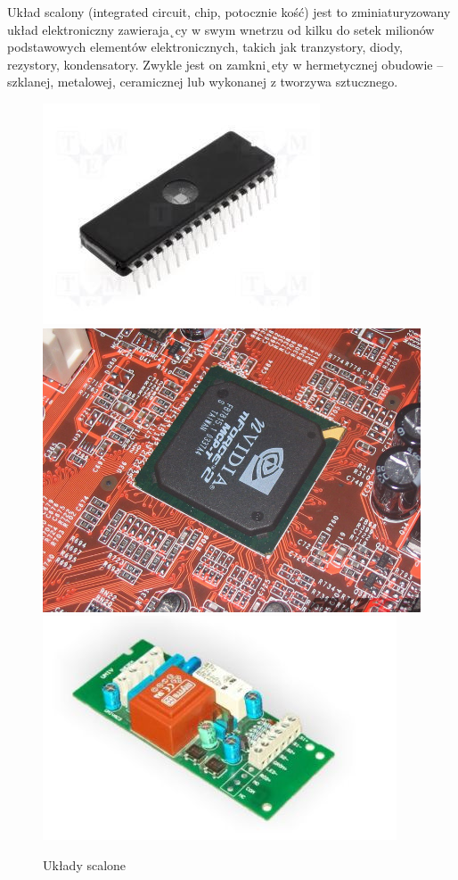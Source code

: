 \documentclass[a4paper,11pt]{article}
\begin{document}
Układ scalony (integrated circuit, chip, potocznie kość) jest to zminiaturyzowany układ elektroniczny
zawieraja˛cy w swym wnetrzu od kilku do setek milionów podstawowych elementów
elektronicznych, takich jak tranzystory, diody, rezystory, kondensatory. Zwykle jest on zamkni˛ety
w hermetycznej obudowie – szklanej, metalowej, ceramicznej lub wykonanej z tworzywa sztucznego.
\begin{figure}[!htb]
	\includegraphics[scale=0.4]{uklad1}
	\includegraphics[scale=0.4]{uklad2}
	\includegraphics[scale=0.4]{uklad3}
	\caption{Układy scalone}
	\label{fig:Uklady scalone}
\end{figure}
\end{document}
